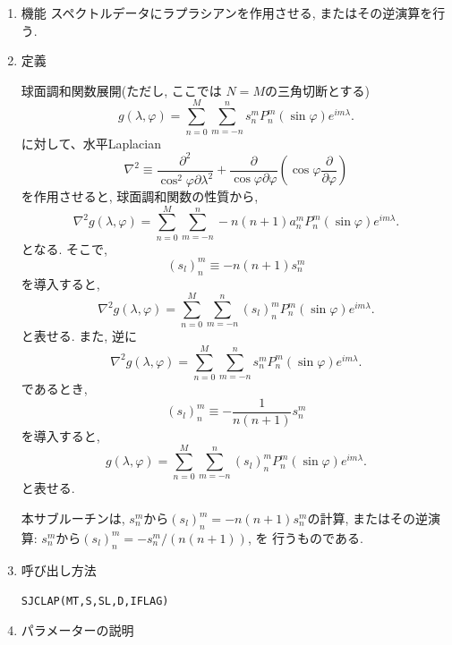 \documentclass[a4j]{jarticle}
\begin{document}
\begin{enumerate}

\item 機能 
スペクトルデータにラプラシアンを作用させる, またはその逆演算を行う.

\item 定義

球面調和関数展開(ただし, ここでは $N=M$の三角切断とする)
\begin{equation}
g(\lambda,\varphi)=\sum^M_{n=0}\sum^n_{m=-n}
s^m_nP^m_n(\sin\varphi)e^{im\lambda}.
\end{equation}
に対して、水平Laplacian
\begin{equation}
\nabla^2\equiv
\frac{\partial^2}{\cos^2\varphi\partial\lambda^2}
+\frac{\partial}{\cos\varphi\partial\varphi}\left(\cos\varphi\frac{\partial}{\partial\varphi}\right)
\end{equation}
を作用させると, 球面調和関数の性質から, 
\begin{equation}
\nabla^2 g(\lambda,\varphi)
=\sum^M_{n=0}\sum^n_{m=-n}-n(n+1)a^m_nP^m_n(\sin\varphi)e^{im\lambda}.
\end{equation}
となる. そこで,
\begin{equation}
(s_l)^m_n\equiv -n(n+1)s^m_n
\end{equation}
を導入すると, 
\begin{equation}
\nabla^2 g(\lambda,\varphi)
=\sum^M_{n=0}\sum^n_{m=-n}(s_l)^m_nP^m_n(\sin\varphi)e^{im\lambda}.
\end{equation}
と表せる. 
また, 逆に
\begin{equation}
\nabla^2 g(\lambda,\varphi)
=\sum^M_{n=0}\sum^n_{m=-n}s^m_nP^m_n(\sin\varphi)e^{im\lambda}.
\end{equation}
であるとき, 
\begin{equation}
(s_l)^m_n\equiv -\frac1{n(n+1)}s^m_n
\end{equation}
を導入すると, 
\begin{equation}
g(\lambda,\varphi)
=\sum^M_{n=0}\sum^n_{m=-n}(s_l)^m_nP^m_n(\sin\varphi)e^{im\lambda}.
\end{equation}
と表せる. 

本サブルーチンは,
$s^m_n$から$(s_l)^m_n = -n(n+1)s^m_n$の計算, 
またはその逆演算: $s^m_n$から$(s_l)^m_n = -s^m_n/(n(n+1))$, を
行うものである. 

\item 呼び出し方法 
    
{\tt SJCLAP(MT,S,SL,D,IFLAG)}
  
\item パラメーターの説明


\end{enumerate}
\end{document}

